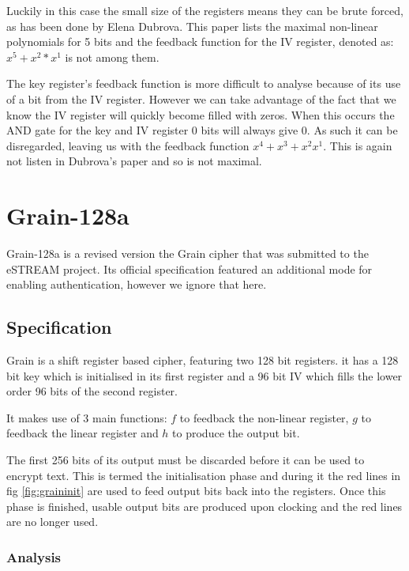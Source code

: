 \documentclass{report}
\let\Oldsection\section
\renewcommand{\section}{\FloatBarrier\Oldsection}
\let\Oldsubsection\subsection
\renewcommand{\subsection}{\FloatBarrier\Oldsubsection}
\let\Oldsubsubsection\subsubsection
\renewcommand{\subsubsection}{\FloatBarrier\Oldsubsubsection}
\begin{document}
Luckily in this case the small size of the registers means they can be brute forced, as has been done by Elena Dubrova\cite{nlfsrFeedback}. This paper lists the maximal non-linear polynomials for 5 bits and the feedback function for the IV register, denoted as: $x^5+x^2*x^1$ is not among them. 

The key register's feedback function is more difficult to analyse because of its use of a bit from the IV register. However we can take advantage of the fact that we know the IV register will quickly become filled with zeros. When this occurs the  AND gate for the key and IV register 0 bits will always give 0. As such it can be disregarded, leaving us with the feedback function $x^4+x^3+x^2x^1$. This is again not listen in Dubrova's paper and so is not maximal.

\section{Grain-128a}
Grain-128a is a revised version the Grain cipher that was submitted to the eSTREAM project\cite{Grain128aSpec}. Its official specification featured an additional mode for enabling authentication, however we ignore that here.
\begin{figure}[h]
\end{figure}
\subsection{Specification}
Grain is a shift register based cipher, featuring two 128 bit registers. it has a 128 bit key which is initialised in its first register and a 96 bit IV which fills the lower order 96 bits of the second register.

It makes use of 3 main functions: $f$ to feedback the non-linear register, $g$ to feedback the linear register and $h$ to produce the output bit.

The first 256 bits of its output must be discarded before it can be used to encrypt text. This is termed the initialisation phase and during it the red lines in fig \ref{fig:graininit} are used to feed output bits back into the registers. Once this phase is finished, usable output bits are produced upon clocking and the red lines are no longer used.
\subsubsection{Analysis}
\end{document}
